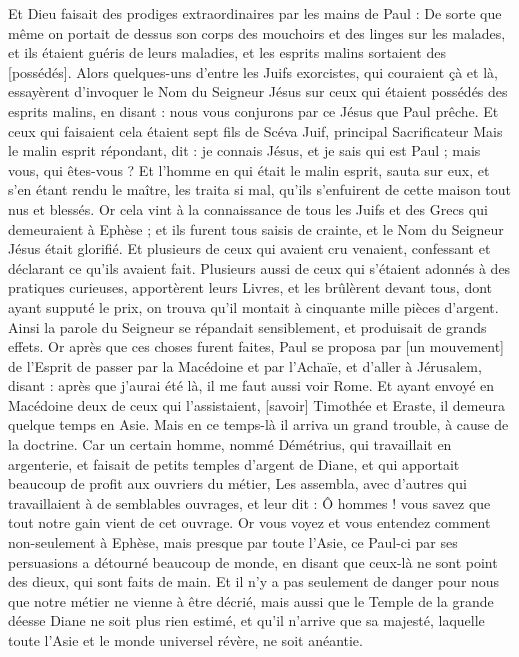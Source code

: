 \begin{multicols}{2}
Et Dieu faisait des prodiges extraordinaires par les mains de Paul :
De sorte que même on portait de dessus son corps des mouchoirs et des linges sur les malades, et ils étaient guéris de leurs maladies, et les esprits malins sortaient des [possédés].
Alors quelques-uns d'entre les Juifs exorcistes, qui couraient çà et là, essayèrent d'invoquer le Nom du Seigneur Jésus sur ceux qui étaient possédés des esprits malins, en disant : nous vous conjurons par ce Jésus que Paul prêche.
Et ceux qui faisaient cela étaient sept fils de Scéva Juif, principal Sacrificateur
Mais le malin esprit répondant, dit : je connais Jésus, et je sais qui est Paul ; mais vous, qui êtes-vous ?
Et l'homme en qui était le malin esprit, sauta sur eux, et s'en étant rendu le maître, les traita si mal, qu'ils s'enfuirent de cette maison tout nus et blessés.
Or cela vint à la connaissance de tous les Juifs et des Grecs qui demeuraient à Ephèse ; et ils furent tous saisis de crainte, et le Nom du Seigneur Jésus était glorifié.
Et plusieurs de ceux qui avaient cru venaient, confessant et déclarant ce qu'ils avaient fait.
Plusieurs aussi de ceux qui s'étaient adonnés à des pratiques curieuses, apportèrent leurs Livres, et les brûlèrent devant tous, dont ayant supputé le prix, on trouva qu'il montait à cinquante mille pièces d'argent.
Ainsi la parole du Seigneur se répandait sensiblement, et produisait de grands effets.
Or après que ces choses furent faites, Paul se proposa par [un mouvement] de l'Esprit de passer par la Macédoine et par l'Achaïe, et d'aller à Jérusalem, disant : après que j'aurai été là, il me faut aussi voir Rome.
Et ayant envoyé en Macédoine deux de ceux qui l'assistaient, [savoir] Timothée et Eraste, il demeura quelque temps en Asie.
Mais en ce temps-là il arriva un grand trouble, à cause de la doctrine.
Car un certain homme, nommé Démétrius, qui travaillait en argenterie, et faisait de petits temples d'argent de Diane, et qui apportait beaucoup de profit aux ouvriers du métier,
Les assembla, avec d'autres qui travaillaient à de semblables ouvrages, et leur dit : Ô hommes ! vous savez que tout notre gain vient de cet ouvrage.
Or vous voyez et vous entendez comment non-seulement à Ephèse, mais presque par toute l'Asie, ce Paul-ci par ses persuasions a détourné beaucoup de monde, en disant que ceux-là ne sont point des dieux, qui sont faits de main.
Et il n'y a pas seulement de danger pour nous que notre métier ne vienne à être décrié, mais aussi que le Temple de la grande déesse Diane ne soit plus rien estimé, et qu'il n'arrive que sa majesté, laquelle toute l'Asie et le monde universel révère, ne soit anéantie.

\end{multicols}
